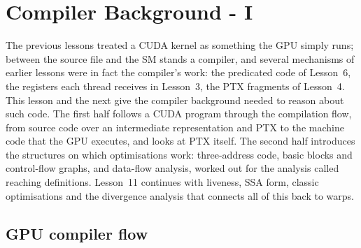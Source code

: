 \documentclass[../main.tex]{subfiles}
\begin{document}
\newcommand{\lxOUT}{\mathrm{OUT}}\newcommand{\lxIN}{\mathrm{IN}}
\newcommand{\lxENTRY}{\mathrm{ENTRY}}\newcommand{\lxgen}{\mathrm{gen}}
\newcommand{\lxkill}{\mathrm{kill}}\newcommand{\lxpred}{\mathrm{pred}}

\chapter{Compiler Background - I}

The previous lessons treated a CUDA kernel as something the GPU simply
runs; between the source file and the SM stands a compiler, and several
mechanisms of earlier lessons were in fact the compiler's work: the
predicated code of Lesson~6, the registers each thread receives in
Lesson~3, the PTX fragments of Lesson~4.  This lesson and the next give
the compiler background needed to reason about such code.  The first
half follows a CUDA program through the compilation flow, from source
code over an intermediate representation and PTX to the machine code
that the GPU executes, and looks at PTX itself.  The second half
introduces the structures on which optimisations work: three-address
code, basic blocks and control-flow graphs, and data-flow analysis,
worked out for the analysis called reaching definitions.  Lesson~11
continues with liveness, SSA form, classic optimisations and the
divergence analysis that connects all of this back to warps.

\section{GPU compiler flow}
\label{sec:l10-flow}
\end{document}
